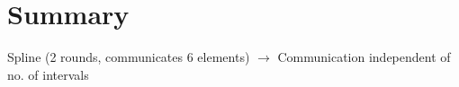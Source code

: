 
\clearpage
{}

%
\setcounter{section}{0} %

\section{Summary}
Spline (2 rounds, communicates 6 elements) $\rightarrow$ Communication independent of no. of intervals

